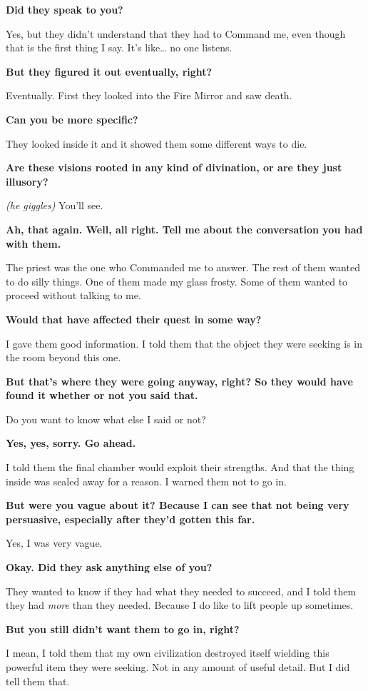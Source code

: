 \documentclass[smalldemyvopaper,11pt,twoside,onecolumn,openright,extrafontsizes]{memoir}
\begin{document}
\textbf{Did they speak to you?}

Yes, but they didn't understand that they had to Command me, even though
that is the first thing I say. It's like\ldots{} no one listens.

\textbf{But they figured it out eventually, right?}

Eventually. First they looked into the Fire Mirror and saw death.

\textbf{Can you be more specific?}

They looked inside it and it showed them some different ways to die.

\textbf{Are these visions rooted in any kind of divination, or are they
just illusory?}

\emph{(he giggles)} You'll see.

\textbf{Ah, that again. Well, all right. Tell me about the conversation
you had with them.}

The priest was the one who Commanded me to answer. The rest of them
wanted to do silly things. One of them made my glass frosty. Some of
them wanted to proceed without talking to me.

\textbf{Would that have affected their quest in some way?}

I gave them good information. I told them that the object they were
seeking is in the room beyond this one.

\textbf{But that's where they were going anyway, right? So they would
have found it whether or not you said that.}

Do you want to know what else I said or not?

\textbf{Yes, yes, sorry. Go ahead.}

I told them the final chamber would exploit their strengths. And that
the thing inside was sealed away for a reason. I warned them not to go
in.

\textbf{But were you vague about it? Because I can see that not being
very persuasive, especially after they'd gotten this far.}

Yes, I was very vague.

\textbf{Okay. Did they ask anything else of you?}

They wanted to know if they had what they needed to succeed, and I told
them they had \emph{more} than they needed. Because I do like to lift
people up sometimes.

\textbf{But you still didn't want them to go in, right?}

I mean, I told them that my own civilization destroyed itself wielding
this powerful item they were seeking. Not in any amount of useful
detail. But I did tell them that.
\end{document}
